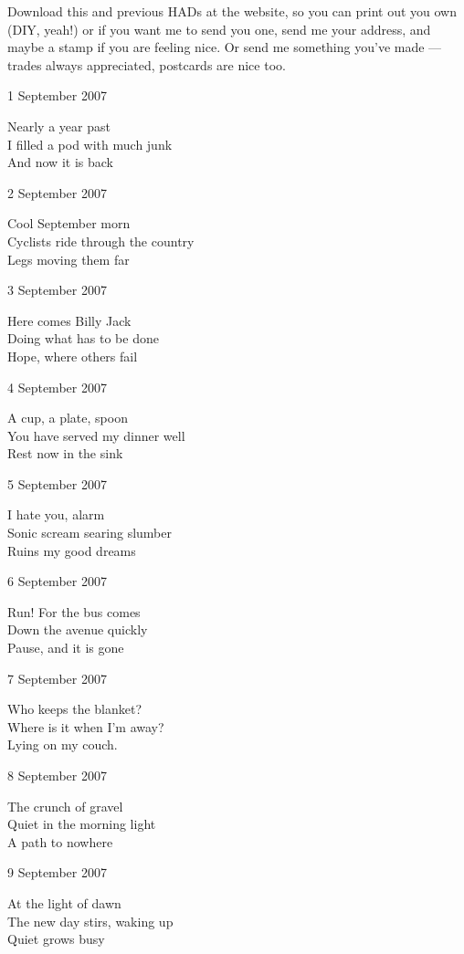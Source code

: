 \documentclass[12pt]{article}
\begin{document}
Download this and previous HADs at the website, so you can
print out you own (DIY, yeah!) or if you want me to send
you one, send me your address, and maybe a stamp if you
are feeling nice. Or send me something you've made ---
trades always appreciated, postcards are nice too.


1 September 2007

Nearly a year past \\
I filled a pod with much junk \\
And now it is back

2 September 2007

Cool September morn \\
Cyclists ride through the country \\
Legs moving them far


\newpage

3 September 2007

Here comes Billy Jack \\
Doing what has to be done \\
Hope, where others fail

4 September 2007

A cup, a plate, spoon \\
You have served my dinner well \\
Rest now in the sink

5 September 2007

I hate you, alarm \\
Sonic scream searing slumber \\
Ruins my good dreams

6 September 2007

Run! For the bus comes \\
Down the avenue quickly \\
Pause, and it is gone

7 September 2007

Who keeps the blanket? \\
Where is it when I'm away? \\
Lying on my couch.

8 September 2007

The crunch of gravel \\
Quiet in the morning light \\
A path to nowhere

9 September 2007

At the light of dawn \\
The new day stirs, waking up \\
Quiet grows busy
\end{document}
